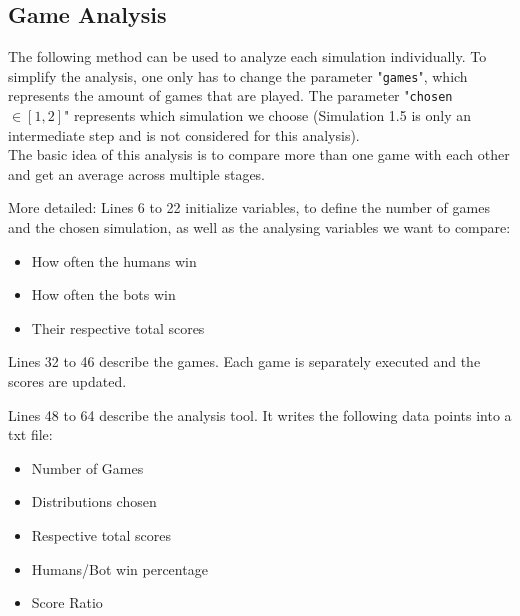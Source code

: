 \documentclass{article}
\begin{document}




\subsection{Game Analysis}
\label{sec:Game Analysis}
The following method can be used to analyze each simulation individually. To simplify the analysis, one only has to change the parameter "\texttt{games}", which represents the amount of games that are played. The parameter "\texttt{chosen} $\in [1,2]$" represents which simulation we choose (Simulation 1.5 is only an intermediate step and is not considered for this analysis).\\
The basic idea of this analysis is to compare more than one game with each other and get an average across multiple stages.

More detailed:
Lines 6 to 22 initialize variables, to define the number of games and the chosen simulation, as well as the analysing variables we want to compare:
\begin{itemize}
    \item How often the humans win
    \item How often the bots win
    \item Their respective total scores
\end{itemize}

Lines 32 to 46 describe the games. Each game is separately executed and the scores are updated. 

Lines 48 to 64 describe the analysis tool. It writes the following data points into a txt file: 
\begin{itemize}
    \item Number of Games
    \item Distributions chosen
    \item Respective total scores
    \item Humans/Bot win percentage
    \item Score Ratio
\end{itemize}






\newpage
\end{document}
